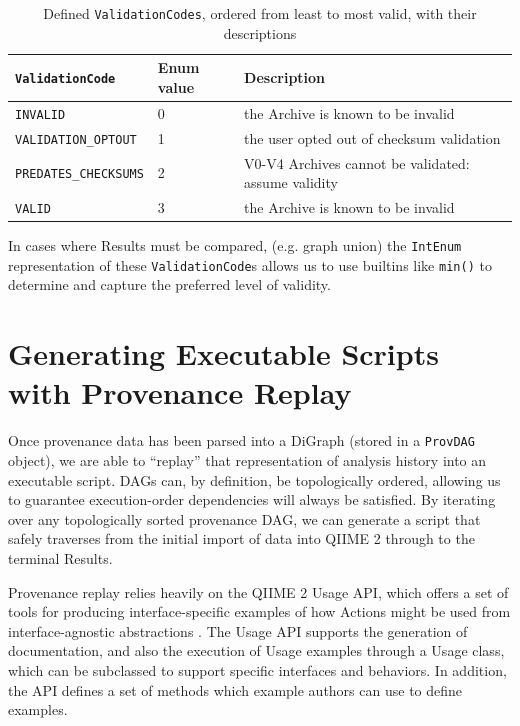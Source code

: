 \begin{table}[htp]
    \centering
    \begin{tabular}{|p{}|p{}|p{}|}
    \hline
    \texttt{ValidationCode}      & Enum value & Description                                          \\ \hline
    \texttt{INVALID}             & 0          & the Archive is known to be invalid                   \\
    \texttt{VALIDATION\_OPTOUT}  & 1          & the user opted out of checksum validation            \\
    \texttt{PREDATES\_CHECKSUMS} & 2          & V0-V4 Archives cannot be validated: assume validity  \\
    \texttt{VALID}               & 3          & the Archive is known to be invalid                   \\ \hline
    \end{tabular}
    \caption[Defined ValidationCodes, ordered from least to most valid, with their descriptions]%
    {Defined \texttt{ValidationCodes}, ordered from least to most valid, with their descriptions}
    \label{tab:validationCodes}
\end{table}

\noindent In cases where Results must be compared, (e.g. graph union) the \texttt{IntEnum}
representation of these \texttt{ValidationCode}s allows us to use builtins like \texttt{min()} to
determine and capture the preferred level of validity.


\section{Generating Executable Scripts with Provenance Replay}

Once provenance data has been parsed into a DiGraph (stored in a \texttt{ProvDAG}
object), we are able to “replay” that representation of analysis history into an
executable script. DAGs can, by definition, be topologically ordered, allowing
us to guarantee execution-order dependencies will always be satisfied. By
iterating over any topologically sorted provenance DAG, we can generate a script
that safely traverses from the initial import of data into QIIME 2 through to
the terminal Results.

Provenance replay relies heavily on the QIIME 2 Usage API, which offers a set of
tools for producing interface-specific examples of how Actions might be used
from interface-agnostic abstractions \parencite{qiime_2_development_team_usage_2018}.
The Usage API supports the generation of documentation, and also the execution
of Usage examples through a Usage class, which can be subclassed to support
specific interfaces and behaviors. In addition, the API defines a set of methods
which example authors can use to define examples.

